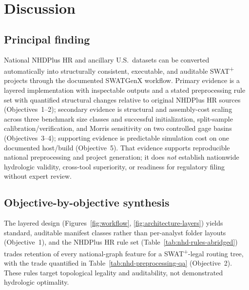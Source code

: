 \section{Discussion}

\subsection{Principal finding}

National NHDPlus HR and ancillary U.S.\ datasets can be converted automatically into structurally consistent, executable, and auditable SWAT\textsuperscript{+} projects through the documented SWATGenX workflow.
Primary evidence is a layered implementation with inspectable outputs and a stated preprocessing rule set with quantified structural changes relative to original NHDPlus HR sources (Objectives~1--2); secondary evidence is structural and assembly-cost scaling across three benchmark size classes and successful initialization, split-sample calibration/verification, and Morris sensitivity on two controlled gage basins (Objectives~3--4); supporting evidence is predictable simulation cost on one documented host/build (Objective~5).
That evidence supports reproducible national preprocessing and project generation; it does \emph{not} establish nationwide hydrologic validity, cross-tool superiority, or readiness for regulatory filing without expert review.

\subsection{Objective-by-objective synthesis}

The layered design (Figures~\ref{fig:workflow}, \ref{fig:architecture-layers}) yields standard, auditable manifest classes rather than per-analyst folder layouts (Objective~1), and the NHDPlus HR rule set (Table~\ref{tab:nhd-rules-abridged}) trades retention of every national-graph feature for a SWAT\textsuperscript{+}-legal routing tree, with the trade quantified in Table~\ref{tab:nhd-preprocessing-qa} (Objective~2). These rules target topological legality and auditability, not demonstrated hydrologic optimality.

